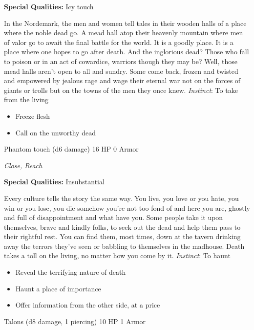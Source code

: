 \textbf{Special Qualities:}
Icy touch

\HRule
In the Nordemark, the men and women tell tales in their wooden halls of a place where the noble dead go. A mead hall atop their heavenly mountain where men of valor go to await the final battle for the world. It is a goodly place. It is a place where one hopes to go after death. And the inglorious dead? Those who fall to poison or in an act of cowardice, warriors though they may be? Well, those mead halls aren't open to all and sundry. Some come back, frozen and twisted and empowered by jealous rage and wage their eternal war not on the forces of giants or trolls but on the towns of the men they once knew. \emph{Instinct}: To take from the living
\begin{itemize}
\item Freeze flesh
\item Call on the unworthy dead
\end{itemize}

\HRule
{}

Phantom touch (d6 damage)\hspace*{\fill} 16 HP 0 Armor

\emph{Close, Reach}

\textbf{Special Qualities:}
Insubstantial

\HRule
Every culture tells the story the same way. You live, you love or you hate, you win or you lose, you die somehow you're not too fond of and here you are, ghostly and full of disappointment and what have you. Some people take it upon themselves, brave and kindly folks, to seek out the dead and help them pass to their rightful rest. You can find them, most times, down at the tavern drinking away the terrors they've seen or babbling to themselves in the madhouse. Death takes a toll on the living, no matter how you come by it. \emph{Instinct}: To haunt
\begin{itemize}
\item Reveal the terrifying nature of death
\item Haunt a place of importance
\item Offer information from the other side, at a price
\end{itemize}

\HRule
{}

Talons (d8 damage, 1 piercing)\hspace*{\fill} 10 HP 1 Armor


